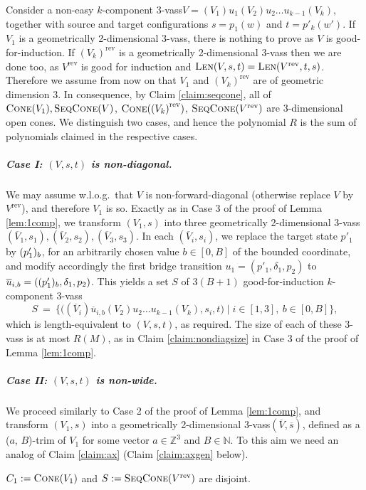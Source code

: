 \documentclass[a4paper, UKenglish, cleveref, autoref, thm-restate]{lipics-v2021}
\newcommand{\N}{\mathbb{N}}
\newcommand{\Z}{\mathbb{Z}}
\newcommand{\set}[1]{\{#1\}}
\newcommand{\setof}[2]{\set{#1 \mid #2}}
\newcommand{\Len}[3]{\textsc{Len}(#1, #2, #3)}
\newcommand{\mytrim}[2]{(#1, #2)-trim}
\newcommand{\vass}{{\sc vass}\xspace}
\newcommand{\tvass}{\parvass 3}
\newcommand{\geomvass}{geometrically 2-dimensional \tvass}
\newcommand{\parvass}[1]{{$#1$-\vass}\xspace}
\newcommand{\ktvass}{(V_1) u_1 (V_2) u_2 \ldots u_{k-1} (V_k)}
\newcommand{\ktvassmod}{(\essdvass V_i) \essdvass u_{i, b} (V_2) u_2 \ldots u_{k-1} (V_k)}
\newcommand{\para}[1]{\vspace{-3mm}\subparagraph*{\bf #1.}}
\newcommand{\setfromto}[2]{[#1, #2]}
\newcommand{\setto}[1]{\setfromto 1 {#1}}
\newcommand{\mywlog}{w.l.o.g.~}
\newcommand{\rev}[1]{{#1}^{\text{rev}}}
\newcommand{\cone}[1]{\textsc{Cone}(#1)}
\newcommand{\seqcone}[1]{\textsc{SeqCone}(#1)}
\newcommand{\essdvass}[1]{\overline{#1}}
\begin{document}
\begin{appendixproof}
Consider a non-easy $k$-component \tvass $V = \ktvass$, together with
source and target configurations $s = p_1(w)$ and $t=p'_k(w')$.
If $V_1$  is a \geomvass, there is nothing to prove as $V$ is good-for-induction.
If $\rev{(V_k)}$ is a \geomvass then we are done too, as $\rev V$ is good for induction and 
$\Len V s t = \Len{\rev V} t s$.
Therefore we assume from now on that $V_1$ and $\rev{(V_k)}$ are of geometric dimension 3. 
In consequence, by Claim \ref{claim:seqcone}, all of $\cone {V_1}, \seqcone V$, $\cone{\rev{(V_k)}}$, $\seqcone{\rev V}$ are
3-dimensional open cones.
We distinguish two cases, and hence the polynomial $R$ is the sum of polynomials claimed
in the respective cases.

\para{Case I: $(V, s, t)$ is non-diagonal}
We may assume \mywlog that $V$ is non-forward-diagonal (otherwise replace $V$ by $\rev V$),
and therefore $V_1$ is so.
Exactly as in Case 3 of the proof of Lemma \ref{lem:1comp}, we transform
$(V_1,s)$ into
three \geomvass $(\essdvass V_1, s_1), (\essdvass V_2, s_2), (\essdvass V_3, s_3)$.
In each $(\essdvass V_i, s_i)$, we replace the target state $p'_1$ by
$(p'_1)_{b}$, for an arbitrarily chosen value $b\in\setfromto 0 B$ of the bounded coordinate,
and modify accordingly the first bridge transition $u_1 = (p'_1, \delta_1, p_2)$ to 
$\essdvass u_{i, b} = (\pair{(p'_1)} b, \delta_1, p_2)$.
This yields a set $S$ of $3(B+1)$ good-for-induction $k$-component \tvass  
\[
S \ = \ \setof{\big(\ktvassmod, s_i, t \big)}{i\in\setto 3, \ b\in \setfromto 0 B},
\]
which is length-equivalent to $(V, s, t)$, as required. 
The size of each of these \tvass is
at most $R(M)$, as in Claim \ref{claim:nondiagsize} in Case 3 of the proof of Lemma \ref{lem:1comp}.

\para{Case II: $(V, s, t)$ is non-wide}
We proceed similarly to Case 2 of the proof of Lemma \ref{lem:1comp}, and transform
$(V_1,s)$ into a \geomvass $(\essdvass V, \essdvass s)$, defined as a \mytrim {$a$} {$B$} of $V_1$
for some vector $a\in\Z^3$ and $B\in\N$.
To this aim we need an analog of Claim \ref{claim:ax} (Claim \ref{claim:axgen} below).
\begin{claim}\label{claim:empty_intersection}
$C_1 :=  \cone{V_1}$ and $S := \seqcone{\rev V}$ are disjoint.
\end{claim}


\end{appendixproof}
\end{document}
